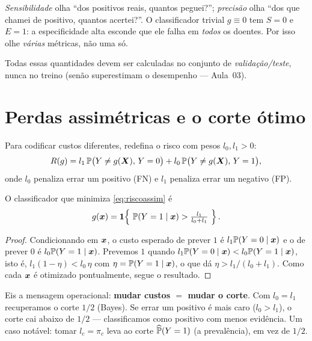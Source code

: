 \documentclass[11pt,a4paper]{article}
\begin{document}
\begin{ideia}
\emph{Sensibilidade} olha ``dos positivos reais, quantos peguei?''; \emph{precisão}
olha ``dos que chamei de positivo, quantos acertei?''. O classificador trivial
$g\equiv 0$ tem $S=0$ e $E=1$: a especificidade alta esconde que ele falha em
\emph{todos} os doentes. Por isso olhe \emph{várias} métricas, não uma só.
\end{ideia}

\begin{atencao}
Todas essas quantidades devem ser calculadas no conjunto de \emph{validação/teste},
nunca no treino (senão superestimam o desempenho --- Aula~03).
\end{atencao}

\section{Perdas assimétricas e o corte ótimo}
Para codificar custos diferentes, redefina o risco com pesos $l_0,l_1>0$:
\begin{equation}\label{eq:riscoassim}
  R(g) = l_1\,\mathbb{P}\big(Y\ne g(\bm{X}),\,Y=0\big)
            + l_0\,\mathbb{P}\big(Y\ne g(\bm{X}),\,Y=1\big),
\end{equation}
onde $l_0$ penaliza errar um positivo (FN) e $l_1$ penaliza errar um negativo (FP).

\begin{proposicao}\label{prop:corte}
O classificador que minimiza \eqref{eq:riscoassim} é
\[
  g(\bm{x}) = \mathbf{1}\!\left\{\ \mathbb{P}(Y=1\mid\bm{x}) > \tfrac{l_1}{l_0+l_1}\ \right\}.
\]
\end{proposicao}
\begin{proof}
Condicionando em $\bm{x}$, o custo esperado de prever $1$ é $l_1\mathbb{P}(Y=0\mid\bm{x})$ e o de
prever $0$ é $l_0\mathbb{P}(Y=1\mid\bm{x})$. Prevemos $1$ quando
$l_1\mathbb{P}(Y=0\mid\bm{x}) < l_0\mathbb{P}(Y=1\mid\bm{x})$, isto é,
$l_1(1-\eta) < l_0\,\eta$ com $\eta=\mathbb{P}(Y=1\mid\bm{x})$, o que dá
$\eta > l_1/(l_0+l_1)$. Como cada $\bm{x}$ é otimizado pontualmente, segue o resultado.
\end{proof}

\begin{ideia}
Eis a mensagem operacional: \textbf{mudar custos $=$ mudar o corte}. Com $l_0=l_1$
recuperamos o corte $1/2$ (Bayes). Se errar um positivo é mais caro ($l_0>l_1$), o
corte cai abaixo de $1/2$ --- classificamos como positivo com menos evidência. Um
caso notável: tomar $l_c=\pi_c$ leva ao corte $\widehat{\mathbb{P}}(Y=1)$ (a prevalência),
em vez de $1/2$.
\end{ideia}
\end{document}
